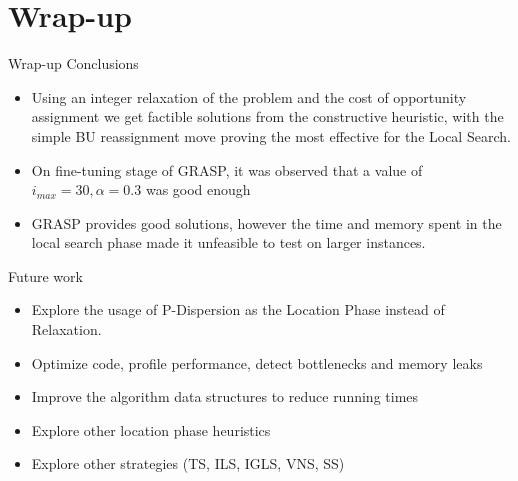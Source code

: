 \documentclass{beamer}
\begin{document}
\section{Wrap-up}

\begin{frame}{Wrap-up}
    \small Conclusions
    \scriptsize
    \begin{itemize}
        \item Using an integer relaxation of the problem and the cost of opportunity assignment we get factible solutions from the constructive heuristic, with the simple BU reassignment move proving the most effective for the Local Search.
        \item On fine-tuning stage of GRASP, it was observed that a value of $i_{max} = 30, \alpha = 0.3$ was good enough
        \item GRASP provides good solutions, however the time and memory spent in the local search phase made it unfeasible to test on larger instances.
    \end{itemize}
    \small Future work
    \scriptsize
    \begin{itemize}
        \item Explore the usage of P-Dispersion as the Location Phase instead of Relaxation.
        \item Optimize code, profile performance, detect bottlenecks and memory leaks
        \item Improve the algorithm data structures to reduce running times
        \item Explore other location phase heuristics
        \item Explore other strategies (TS, ILS, IGLS, VNS, SS)
    \end{itemize}
\end{frame}
\end{document}

